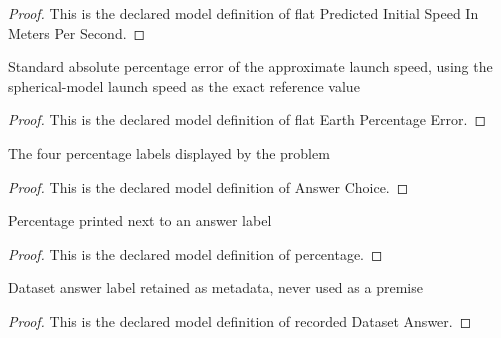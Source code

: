 \begin{proof}
  This is the declared model definition of flat Predicted Initial Speed In Meters Per Second.
\end{proof}
\begin{definition}
  \label{def:physics:phyx-mini-0715:phyxminiproblems-problemphyxmini0715-flatearthpercentageerror}
  Standard absolute percentage error of the approximate launch speed, using the spherical-model launch speed as the exact reference value
\end{definition}
\begin{proof}
  This is the declared model definition of flat Earth Percentage Error.
\end{proof}
\begin{definition}
  \label{def:physics:phyx-mini-0715:phyxminiproblems-problemphyxmini0715-answerchoice}
  The four percentage labels displayed by the problem
\end{definition}
\begin{proof}
  This is the declared model definition of Answer Choice.
\end{proof}
\begin{definition}[percentage]
  \label{def:physics:phyx-mini-0715:phyxminiproblems-problemphyxmini0715-answerchoice-percentage}
  Percentage printed next to an answer label
\end{definition}
\begin{proof}
  This is the declared model definition of percentage.
\end{proof}
\begin{definition}
  \label{def:physics:phyx-mini-0715:phyxminiproblems-problemphyxmini0715-recordeddatasetanswer}
  Dataset answer label retained as metadata, never used as a premise
\end{definition}
\begin{proof}
  This is the declared model definition of recorded Dataset Answer.
\end{proof}
